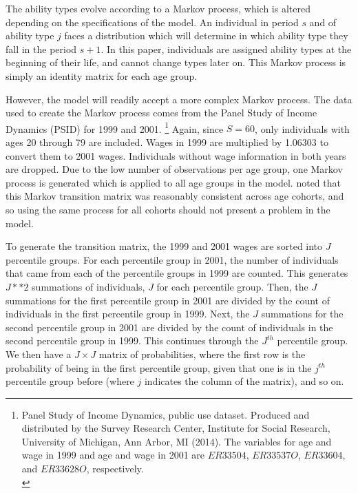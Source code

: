 \documentclass[letterpaper,12pt]{article}
\theoremstyle{definition}
\begin{document}
  The ability types evolve according to a Markov process, which is altered depending on the specifications of the model.  An individual in period $s$ and of ability type $j$ faces a distribution which will determine in which ability type they fall in the period $s+1$.  In this paper, individuals are assigned ability types at the beginning of their life, and cannot change types later on.  This Markov process is simply an identity matrix for each age group.  

  However, the model will readily accept a more complex Markov process.  The data used to create the Markov process comes from the Panel Study of Income Dynamics (PSID) for 1999 and 2001. \footnote{Panel Study of Income Dynamics, public use dataset. Produced and distributed by the Survey Research Center, Institute for Social Research, University of Michigan, Ann Arbor, MI (2014). The variables for age and wage in 1999 and age and wage in 2001 are $ER33504$, $ER33537O$, $ER33604$, and $ER33628O$, respectively.\\ [-2pt]} Again, since $S=60$, only individuals with ages 20 through 79 are included.  Wages in 1999 are multiplied by 1.06303 to convert them to 2001 wages. Individuals without wage information in both years are dropped. Due to the low number of observations per age group, one Markov process is generated which is applied to all age groups in the model. \cite{Nishiyama:2003} noted that this Markov transition matrix was reasonably consistent across age cohorts, and so using the same process for all cohorts should not present a problem in the model.

  To generate the transition matrix, the 1999 and 2001 wages are sorted into $J$ percentile groups.  For each percentile group in 2001, the number of individuals that came from each of the percentile groups in 1999 are counted.  This generates $J ** 2$ summations of individuals, $J$ for each percentile group.  Then, the $J$ summations for the first percentile group in 2001 are divided by the count of individuals in the first percentile group in 1999.  Next, the $J$ summations for the second percentile group in 2001 are divided by the count of individuals in the second percentile group in 1999.  This continues through the $J^{th}$ percentile group.  We then have a $J \times J$ matrix of probabilities, where the first row is the probability of being in the first percentile group, given that one is in the $j^{th}$ percentile group before (where $j$ indicates the column of the matrix), and so on.
\end{document}
